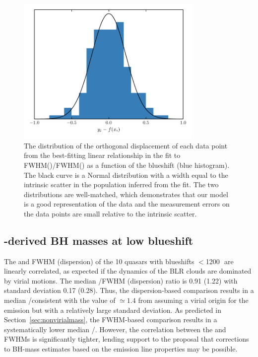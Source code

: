 \begin{figure}
    \includegraphics[width=0.8\textwidth]{figures/chapter03/intrinsic_scatter.pdf} 
    \caption{The distribution of the orthogonal displacement of each data point from the best-fitting linear relationship in the fit to FWHM()/FWHM(\hans) as a function of the  blueshift (blue histogram). The black curve is a Normal distribution with a width equal to the intrinsic scatter in the population inferred from the fit. The two distributions are well-matched, which demonstrates that our model is a good representation of the data and the measurement errors on the data points are small relative to the intrinsic scatter.} 
    \label{fig:intrinsic_scatter}
\end{figure}

\subsection{-derived BH masses at low  blueshift}

The \ha and  FWHM (dispersion) of the 10 quasars with  blueshifts $<$1200\,\kms\, are linearly correlated, as expected if the dynamics of the BLR clouds are dominated by virial motions. 
The median /\ha FWHM (dispersion) ratio is 0.91 (1.22) with standard deviation 0.17 (0.28). 
Thus, the dispersion-based comparison results in a median /\ha consistent with the value of $\simeq1.4$ from assuming a virial origin for the emission but with a relatively large standard deviation. 
As predicted in Section~\ref{sec:nonvirialmass}, the FWHM-based comparison results in a systematically lower median /\hans.
However, the correlation between the  and \ha FWHMs is significantly tighter, lending support to the proposal that corrections to BH-mass estimates based on the  emission line properties may be possible.

